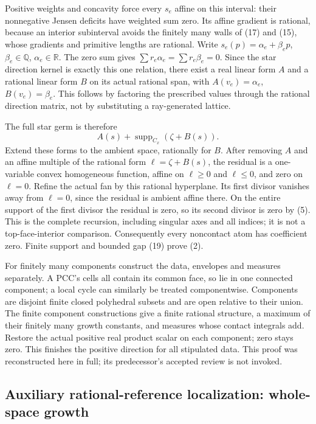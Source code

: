 \documentclass[
  11pt,
]{article}
\begin{document}
Positive weights and concavity force every \(s_e\) affine on this
interval: their nonnegative Jensen deficits have weighted sum zero. Its
affine gradient is rational, because an interior subinterval avoids the
finitely many walls of (17) and (15), whose gradients and primitive
lengths are rational. Write \(s_e(p)=\alpha_e+\beta_ep\),
\(\beta_e\in\mathbb{Q}\), \(\alpha_e\in\mathbb{R}\). The zero sum gives
\(\sum r_e\alpha_e=\sum r_e\beta_e=0\). Since the star direction kernel
is exactly this one relation, there exist a real linear form \(A\) and a
rational linear form \(B\) on its actual rational span, with
\(A(v_e)=\alpha_e\), \(B(v_e)=\beta_e\). This follows by factoring the
prescribed values through the rational direction matrix, not by
substituting a ray-generated lattice.

The full star germ is therefore \[
                              A(s)+\operatorname{supp}_{C_x}(\zeta+B(s)).\tag{27}
\] Extend these forms to the ambient space, rationally for \(B\). After
removing \(A\) and an affine multiple of the rational form
\(\ell=\zeta+B(s)\), the residual is a one-variable convex homogeneous
function, affine on \(\ell\geq0\) and \(\ell\leq0\), and zero on
\(\ell=0\). Refine the actual fan by this rational hyperplane. Its first
divisor vanishes away from \(\ell=0\), since the residual is ambient
affine there. On the entire support of the first divisor the residual is
zero, so its second divisor is zero by (5). This is the complete
recursion, including singular axes and all indices; it is not a
top-face-interior comparison. Consequently every noncontact atom has
coefficient zero. Finite support and bounded gap (19) prove (2).

For finitely many components construct the data, envelopes and measures
separately. A PCC's cells all contain its common face, so lie in one
connected component; a local cycle can similarly be treated
componentwise. Components are disjoint finite closed polyhedral subsets
and are open relative to their union. The finite component constructions
give a finite rational structure, a maximum of their finitely many
growth constants, and measures whose contact integrals add. Restore the
actual positive real product scalar on each component; zero stays zero.
This finishes the positive direction for all stipulated data. This proof
was reconstructed here in full; its predecessor's accepted review is not
invoked.

\subsection{Auxiliary rational-reference localization: whole-space
growth}\label{auxiliary-rational-reference-localization-whole-space-growth}
\end{document}
